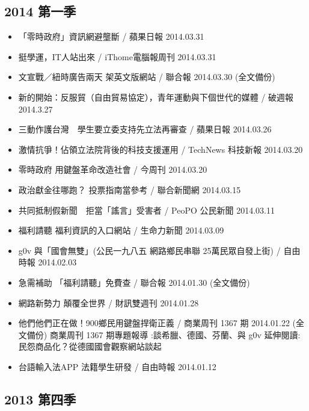 \subsection{2014 第一季}

\begin{itemize}
\item 「零時政府」資訊網避壟斷 / 蘋果日報 2014.03.31
\item 挺學運，IT人站出來 / iThome電腦報周刊 2014.03.31
\item 文宣戰／紐時廣告兩天 架英文版網站 / 聯合報 2014.03.30 (全文備份)
\item 新的開始：反服貿（自由貿易協定），青年運動與下個世代的媒體 / 破週報 2014.3.27
\item 三動作護台灣　學生要立委支持先立法再審查 / 蘋果日報 2014.03.26
\item 激情抗爭！佔領立法院背後的科技支援運用 / TechNews 科技新報 2014.03.20
\item 零時政府 用鍵盤革命改造社會 / 今周刊 2014.03.20
\item 政治獻金往哪跑？ 投票指南當參考 / 聯合新聞網 2014.03.15
\item 共同抵制假新聞　拒當「謠言」受害者 / PeoPO 公民新聞 2014.03.11
\item 福利請聽 福利資訊的入口網站 / 生命力新聞 2014.03.09
\item g0v 與「國會無雙」(公民一九八五 網路鄉民串聯 25萬民眾自發上街) / 自由時報 2014.02.03
\item 急需補助 「福利請聽」免費查 / 聯合報 2014.01.30 (全文備份)
\item 網路新勢力 顛覆全世界 / 財訊雙週刊 2014.01.28
\item
{
 他們他們正在做！900鄉民用鍵盤捍衛正義 / 商業周刊 1367 期 2014.01.22 (全文備份)
 商業周刊 1367 期專題報導 :談希臘、德國、芬蘭、與 g0v
 延伸閱讀: 民怨商品化？從德國國會觀察網站談起
}
\item 台語輸入法APP 法籍學生研發 / 自由時報 2014.01.12
\end{itemize}


\subsection{2013 第四季}

